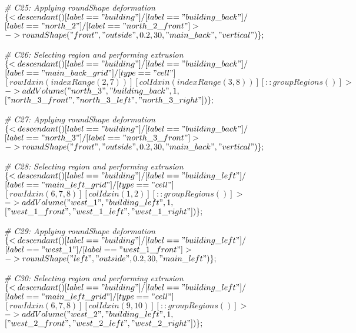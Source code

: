 \noindent \textit{\# C25: Applying roundShape deformation} \\
$\{< descendant() [label=="building"] / [label=="building\_back"] / $\\
$[label=="north\_2"] / [label=="north\_2\_front"] > $\\
$-> roundShape("front", "outside", 0.2, 30, "main\_back", "vertical")\};$

\noindent \textit{\# C26: Selecting region and performing extrusion} \\
$\{< descendant() [label=="building"] / [label=="building\_back"] / $\\
$[label=="main\_back\_grid"] / [type=="cell"] $\\
$[rowIdx in (indexRange(2, 7))] [colIdx in (indexRange(3, 8))] [::groupRegions()] > $\\
$-> addVolume("north\_3", "building\_back", 1, $\\
$["north\_3\_front", "north\_3\_left", "north\_3\_right"])\};$

\noindent \textit{\# C27: Applying roundShape deformation} \\
$\{< descendant() [label=="building"] / [label=="building\_back"] / $\\
$[label=="north\_3"] / [label=="north\_3\_front"] > $\\
$-> roundShape("front", "outside", 0.2, 30, "main\_back", "vertical")\};$

\noindent \textit{\# C28: Selecting region and performing extrusion} \\
$\{< descendant() [label=="building"] / [label=="building\_left"] / $\\
$[label=="main\_left\_grid"] / [type=="cell"] $\\
$[rowIdx in (6, 7, 8)] [colIdx in (1, 2)] [::groupRegions()] > $\\
$-> addVolume("west\_1", "building\_left", 1, $\\
$["west\_1\_front", "west\_1\_left", "west\_1\_right"])\};$

\noindent \textit{\# C29: Applying roundShape deformation} \\
$\{< descendant() [label=="building"] / [label=="building\_left"] / $\\
$[label=="west\_1"] / [label=="west\_1\_front"] > $\\
$-> roundShape("left", "outside", 0.2, 30, "main\_left")\};$

\noindent \textit{\# C30: Selecting region and performing extrusion} \\
$\{< descendant() [label=="building"] / [label=="building\_left"] / $\\
$[label=="main\_left\_grid"] / [type=="cell"] $\\
$[rowIdx in (6, 7, 8)] [colIdx in (9, 10)] [::groupRegions()] > $\\
$-> addVolume("west\_2", "building\_left", 1, $\\
$["west\_2\_front", "west\_2\_left", "west\_2\_right"])\};$

